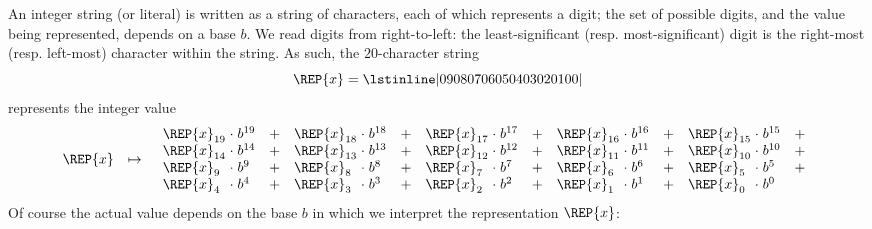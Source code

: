 An integer string (or literal) is written as a string of characters, 
each of which represents a digit; the set of possible digits, and the 
value being represented, depends on a base $b$.  We read digits from 
right-to-left: the least-significant (resp. most-significant) digit 
is the right-most (resp. left-most) character within the string.
As such, the $20$-character string
\[
      \REP{x}  =        \mbox{\lstinline|09080706050403020100|}
\]
represents the integer value
\[
      \begin{array}{lcl}
      \REP{x} &\mapsto& \begin{array}{*{5}{l@{\;}c@{\;}lc}}
                        \REP{x}_{19}  &\cdot&  b^{19} &+&
                        \REP{x}_{18}  &\cdot&  b^{18} &+&
                        \REP{x}_{17}  &\cdot&  b^{17} &+&
                        \REP{x}_{16}  &\cdot&  b^{16} &+&
                        \REP{x}_{15}  &\cdot&  b^{15} &+\\
                        \REP{x}_{14}  &\cdot&  b^{14} &+&
                        \REP{x}_{13}  &\cdot&  b^{13} &+&
                        \REP{x}_{12}  &\cdot&  b^{12} &+&
                        \REP{x}_{11}  &\cdot&  b^{11} &+&
                        \REP{x}_{10}  &\cdot&  b^{10} &+\\
                        \REP{x}_{ 9}  &\cdot&  b^{ 9} &+&
                        \REP{x}_{ 8}  &\cdot&  b^{ 8} &+&
                        \REP{x}_{ 7}  &\cdot&  b^{ 7} &+&
                        \REP{x}_{ 6}  &\cdot&  b^{ 6} &+&
                        \REP{x}_{ 5}  &\cdot&  b^{ 5} &+\\                    
                        \REP{x}_{ 4}  &\cdot&  b^{ 4} &+&
                        \REP{x}_{ 3}  &\cdot&  b^{ 3} &+&
                        \REP{x}_{ 2}  &\cdot&  b^{ 2} &+&
                        \REP{x}_{ 1}  &\cdot&  b^{ 1} &+&
                        \REP{x}_{ 0}  &\cdot&  b^{ 0} & \\
                        \end{array}
      \end{array}
\]
Of course the actual value depends on the base $b$ in which we interpret
the representation $\REP{x}$:

